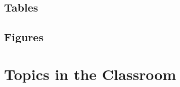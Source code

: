 \subsection{Tables}

\subsection{Figures}

\section{Topics in the Classroom}



\begin{thebibliography}{00}

\end{thebibliography}


